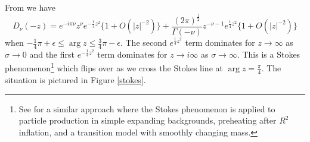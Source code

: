 \documentclass[12pt,a4paper]{article}
\begin{document}
From \cite{Olver1959UniformAE} we have
\begin{equation}
  D_\nu(-z) = e^{-i\pi\nu}z^{\nu}e^{-\frac{1}{4}z^2} \{ 1 + O(|z|^{-2}) \} + \frac{(2 \pi)^{\frac{1}{2}}}{\Gamma(-\nu)} z^{-\nu - 1} e^{\frac{1}{4}z^2} \{1 + O(|z|^{-2})\}
\label{asym}
\end{equation}
when $-\frac{1}{4}\pi + \epsilon \le \arg z \le \frac{3}{4} \pi - \epsilon$.  The second $e^{\frac{1}{4}z^2}$ term dominates for $z \to \infty$ as $\sigma \to 0$ and the first  $e^{-\frac{1}{4}z^2}$ term dominates for $z \to i \infty$ as $\sigma \to \infty$.  This is a Stokes phenomenon\footnote{See \cite{hashiba2021stokes} for a similar approach where the Stokes phenomenon is applied to particle production in simple expanding backgrounds, preheating after $R^2$ inflation, and a transition model with smoothly changing mass.} which flips over as we cross the Stokes line at $\arg z = \frac{\pi}{4}$. The situation is pictured in Figure \ref{stokes}.
\end{document}
